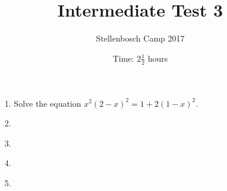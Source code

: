 \documentclass[12pt]{article}
\title{Intermediate Test 3}
\author{Stellenbosch Camp 2017}
\date{Time: $2\frac{1}{2}$ hours}
\begin{document}
 \maketitle

\begin{enumerate}

\item[1.]  %
Solve the equation $x^2(2-x)^2 = 1 + 2(1-x)^2$.


\item[2.] %


\item[3.] %


\item[4.] %


\item[5.] %


\end{enumerate}
\end{document}
